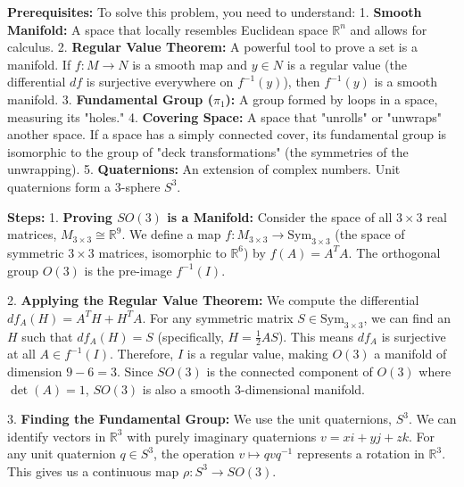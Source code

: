 \begin{solution}
\textbf{Prerequisites:}
To solve this problem, you need to understand:
1. \textbf{Smooth Manifold:} A space that locally resembles Euclidean space $\mathbb{R}^n$ and allows for calculus.
2. \textbf{Regular Value Theorem:} A powerful tool to prove a set is a manifold. If $f: M \to N$ is a smooth map and $y \in N$ is a regular value (the differential $df$ is surjective everywhere on $f^{-1}(y)$), then $f^{-1}(y)$ is a smooth manifold.
3. \textbf{Fundamental Group ($\pi_1$):} A group formed by loops in a space, measuring its "holes."
4. \textbf{Covering Space:} A space that "unrolls" or "unwraps" another space. If a space has a simply connected cover, its fundamental group is isomorphic to the group of "deck transformations" (the symmetries of the unwrapping).
5. \textbf{Quaternions:} An extension of complex numbers. Unit quaternions form a 3-sphere $S^3$.
\par\vspace{\baselineskip}

\textbf{Steps:}
1. \textbf{Proving $SO(3)$ is a Manifold:}
Consider the space of all $3 \times 3$ real matrices, $M_{3 \times 3} \cong \mathbb{R}^9$. We define a map $f: M_{3 \times 3} \to \text{Sym}_{3 \times 3}$ (the space of symmetric $3 \times 3$ matrices, isomorphic to $\mathbb{R}^6$) by $f(A) = A^T A$. The orthogonal group $O(3)$ is the pre-image $f^{-1}(I)$.
\par\vspace{\baselineskip}

2. \textbf{Applying the Regular Value Theorem:}
We compute the differential $df_A(H) = A^T H + H^T A$. For any symmetric matrix $S \in \text{Sym}_{3 \times 3}$, we can find an $H$ such that $df_A(H) = S$ (specifically, $H = \frac{1}{2}A S$). This means $df_A$ is surjective at all $A \in f^{-1}(I)$. Therefore, $I$ is a regular value, making $O(3)$ a manifold of dimension $9 - 6 = 3$. Since $SO(3)$ is the connected component of $O(3)$ where $\det(A) = 1$, $SO(3)$ is also a smooth 3-dimensional manifold.
\par\vspace{\baselineskip}

3. \textbf{Finding the Fundamental Group:}
We use the unit quaternions, $S^3$. We can identify vectors in $\mathbb{R}^3$ with purely imaginary quaternions $v = xi + yj + zk$. For any unit quaternion $q \in S^3$, the operation $v \mapsto qvq^{-1}$ represents a rotation in $\mathbb{R}^3$. This gives us a continuous map $\rho: S^3 \to SO(3)$.
\par\vspace{\baselineskip}


\end{solution}
